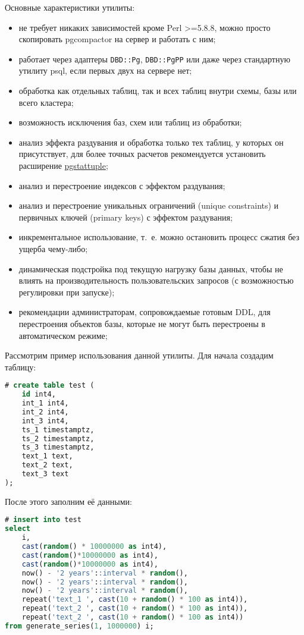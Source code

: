Основные характеристики утилиты:

\begin{itemize}
  \item не требует никаких зависимостей кроме Perl >=5.8.8, можно просто скопировать pgcompactor на сервер и работать с ним;
  \item работает через адаптеры \lstinline!DBD::Pg!, \lstinline!DBD::PgPP! или даже через стандартную утилиту psql, если первых двух на сервере нет;
  \item обработка как отдельных таблиц, так и всех таблиц внутри схемы, базы или всего кластера;
  \item возможность исключения баз, схем или таблиц из обработки;
  \item анализ эффекта раздувания и обработка только тех таблиц, у которых он присутствует, для более точных расчетов рекомендуется установить расширение \href{https://www.postgresql.org/docs/current/static/pgstattuple.html}{pgstattuple};
  \item анализ и перестроение индексов с эффектом раздувания;
  \item анализ и перестроение уникальных ограничений (unique constraints) и первичных ключей (primary keys) с эффектом раздувания;
  \item инкрементальное использование, т.~е. можно остановить процесс сжатия без ущерба чему-либо;
  \item динамическая подстройка под текущую нагрузку базы данных, чтобы не влиять на производительность пользовательских запросов (с возможностью регулировки при запуске);
  \item рекомендации администраторам, сопровождаемые готовым DDL, для перестроения объектов базы, которые не могут быть перестроены в автоматическом режиме;
\end{itemize}

Рассмотрим пример использования данной утилиты. Для начала создадим таблицу:

\begin{lstlisting}[language=SQL,label=lst:pgcompactor1,caption=Создаем test таблицу]
# create table test (
    id int4,
    int_1 int4,
    int_2 int4,
    int_3 int4,
    ts_1 timestamptz,
    ts_2 timestamptz,
    ts_3 timestamptz,
    text_1 text,
    text_2 text,
    text_3 text
);
\end{lstlisting}

После этого заполним её данными:

\begin{lstlisting}[language=SQL,label=lst:pgcompactor2,caption=Заполняем данными test таблицу]
# insert into test
select
    i,
    cast(random() * 10000000 as int4),
    cast(random()*10000000 as int4),
    cast(random()*10000000 as int4),
    now() - '2 years'::interval * random(),
    now() - '2 years'::interval * random(),
    now() - '2 years'::interval * random(),
    repeat('text_1 ', cast(10 + random() * 100 as int4)),
    repeat('text_2 ', cast(10 + random() * 100 as int4)),
    repeat('text_2 ', cast(10 + random() * 100 as int4))
from generate_series(1, 1000000) i;
\end{lstlisting}

